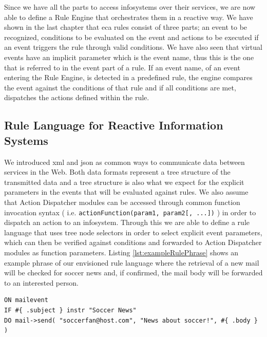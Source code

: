 Since we have all the parts to access \textrm{\glspl{infosystem}} over their services, we are now able to define a \textrm{Rule Engine} that orchestrates them in a reactive way.
We have shown in the last chapter that \textrm{\acrshort{eca}} rules consist of three parts; an event to be recognized, conditions to be evaluated on the event and actions to be executed if an event triggers the rule through valid conditions.
We have also seen that virtual events have an implicit parameter which is the event name, thus this is the one that is referred to in the event part of a rule.
If an event name, of an event entering the \textrm{Rule Engine}, is detected in a predefined rule, the engine compares the event against the conditions of that rule and if all conditions are met, dispatches the actions defined within the rule.


\subsection{Rule Language for Reactive Information Systems}
We introduced \textrm{\acrshort{xml}} and \textrm{\acrshort{json}} as common ways to communicate data between services in the Web.
Both data formats represent a tree structure of the transmitted data and a tree structure is also what we expect for the explicit parameters in the events that will be evaluated against rules.
We also assume that \textrm{Action Dispatcher} modules can be accessed through common function invocation syntax ( i.e. \texttt{actionFunction(param1, param2[, ...])} ) in order to dispatch an action to an \textrm{\gls{infosystem}}.
Through this we are able to define a rule language that uses tree node selectors in order to select explicit event parameters, which can then be verified against conditions and forwarded to \textrm{Action Dispatcher} modules as function parameters.
Listing \ref{lst:exampleRulePhrase} shows an example phrase of our envisioned rule language where the retrieval of a new mail will be checked for soccer news and, if confirmed, the mail body will be forwarded to an interested person.

\begin{lstlisting}[language=OwnRule,label={lst:exampleRulePhrase},caption=Example Phrase in Reactive Rule Language]
ON mailevent
IF #{ .subject } instr "Soccer News"
DO mail->send( "soccerfan@host.com", "News about soccer!", #{ .body } )
\end{lstlisting}



